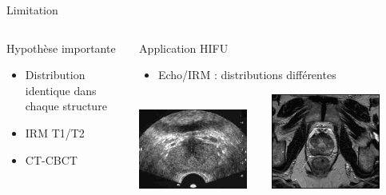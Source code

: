 \documentclass{beamer}
\begin{document}
\begin{frame}{Limitation}
\centering
   \begin{columns}[c]
 \begin{column}{0.5\textwidth}
\begin{block}{Hypothèse importante}
\begin{itemize}
  \item Distribution identique dans chaque structure
  \item IRM T1/T2 
  \item CT-CBCT
  \end{itemize}
\end{block}
 \end{column}
 \begin{column}{0.5\textwidth}
\begin{block}{Application HIFU}
\begin{itemize}
  \item Echo/IRM : distributions différentes
  \end{itemize}
\end{block}
\centering
\includegraphics[width=0.4\textwidth]{images/echo_prostate.jpg}
~~~	
\includegraphics[width=0.4\textwidth]{images/irm_prostate.jpg}
\end{column}
\end{columns}
 
\end{frame}
\end{document}
